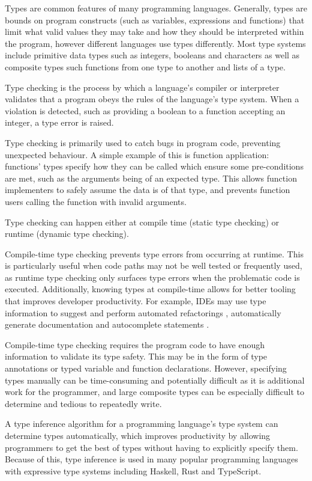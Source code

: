 \documentclass[a4paper,fleqn,oneside,12pt]{report}
\begin{document}
Types are common features of many programming languages. Generally, types are bounds on program constructs (such as variables, expressions and functions) that limit what valid values they may take and how they should be interpreted within the program, however different languages use types differently. Most type systems include primitive data types such as integers, booleans and characters as well as composite types such functions from one type to another and lists of a type.

Type checking is the process by which a language's compiler or interpreter validates that a program obeys the rules of the language's type system. When a violation is detected, such as providing a boolean to a function accepting an integer, a type error is raised.

Type checking is primarily used to catch bugs in program code, preventing unexpected behaviour. A simple example of this is function application: functions’ types specify how they can be called which ensure some pre-conditions are met, such as the arguments being of an expected type. This allows function implementers to safely assume the data is of that type, and prevents function users calling the function with invalid arguments.

Type checking can happen either at compile time (static type checking) or runtime (dynamic type checking).

Compile-time type checking prevents type errors from occurring at runtime. This is particularly useful when code paths may not be well tested or frequently used, as runtime type checking only surfaces type errors when the problematic code is executed. Additionally, knowing types at compile-time allows for better tooling that improves developer productivity. For example, IDEs may use type information to suggest and perform automated refactorings \citep{ref1}, automatically generate documentation \citep{ref2} and autocomplete statements \citep{ref3}.

Compile-time type checking requires the program code to have enough information to validate its type safety. This may be in the form of type annotations or typed variable and function declarations. However, specifying types manually can be time-consuming and potentially difficult as it is additional work for the programmer, and large composite types can be especially difficult to determine and tedious to repeatedly write.

A type inference algorithm for a programming language's type system can determine types automatically, which improves productivity by allowing programmers to get the best of types without having to explicitly specify them. Because of this, type inference is used in many popular programming languages with expressive type systems including Haskell, Rust and TypeScript.
\end{document}
